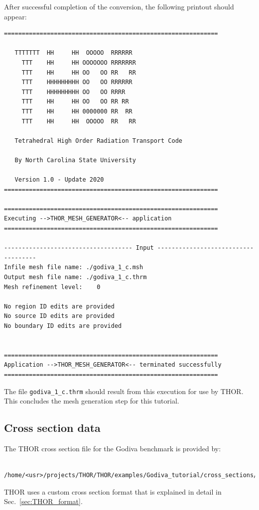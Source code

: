 After successful completion of the conversion, the following printout should appear:
\begin{verbatim}
============================================================

   TTTTTTT  HH     HH  OOOOO  RRRRRR 
     TTT    HH     HH OOOOOOO RRRRRRR
     TTT    HH     HH OO   OO RR   RR
     TTT    HHHHHHHHH OO   OO RRRRRR 
     TTT    HHHHHHHHH OO   OO RRRR   
     TTT    HH     HH OO   OO RR RR  
     TTT    HH     HH 0000000 RR  RR 
     TTT    HH     HH  OOOOO  RR   RR

   Tetrahedral High Order Radiation Transport Code

   By North Carolina State University

   Version 1.0 - Update 2020
============================================================

============================================================
Executing -->THOR_MESH_GENERATOR<-- application
============================================================

------------------------------------ Input ------------------------------------
Infile mesh file name: ./godiva_1_c.msh
Output mesh file name: ./godiva_1_c.thrm
Mesh refinement level:    0

No region ID edits are provided
No source ID edits are provided
No boundary ID edits are provided


============================================================
Application -->THOR_MESH_GENERATOR<-- terminated successfully
============================================================
\end{verbatim}

The file \verb"godiva_1_c.thrm" should result from this execution for use by THOR. This concludes the mesh generation step for this tutorial.

\subsection{Cross section data}
The THOR cross section file for the Godiva benchmark is provided by:
\begin{verbatim}
    /home/<usr>/projects/THOR/THOR/examples/Godiva_tutorial/cross_sections/godiva.xs
\end{verbatim}
THOR uses a custom cross section format that is explained in detail in Sec.~\ref{sec:THOR_format}.

